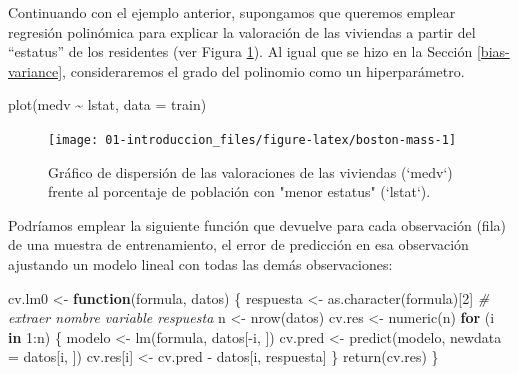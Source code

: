 \documentclass[
  spanish,
]{book}
\newenvironment{Shaded}{\begin{snugshade}}{\end{snugshade}}
\newcommand{\AttributeTok}[1]{\textcolor[rgb]{0.77,0.63,0.00}{#1}}
\newcommand{\CommentTok}[1]{\textcolor[rgb]{0.56,0.35,0.01}{\textit{#1}}}
\newcommand{\ControlFlowTok}[1]{\textcolor[rgb]{0.13,0.29,0.53}{\textbf{#1}}}
\newcommand{\DecValTok}[1]{\textcolor[rgb]{0.00,0.00,0.81}{#1}}
\newcommand{\FunctionTok}[1]{\textcolor[rgb]{0.00,0.00,0.00}{#1}}
\newcommand{\NormalTok}[1]{#1}
\newcommand{\OtherTok}[1]{\textcolor[rgb]{0.56,0.35,0.01}{#1}}
\newcommand{\SpecialCharTok}[1]{\textcolor[rgb]{0.00,0.00,0.00}{#1}}
\theoremstyle{break}
\theoremstyle{definition}
\theoremstyle{definition}
\theoremstyle{definition}
\theoremstyle{definition}
\theoremstyle{remark}
\begin{document}
Continuando con el ejemplo anterior, supongamos que queremos emplear regresión polinómica para explicar la valoración de las viviendas a partir del ``estatus'' de los residentes (ver Figura \ref{fig:boston-mass}).
Al igual que se hizo en la Sección \ref{bias-variance}, consideraremos el grado del polinomio como un hiperparámetro.

\begin{Shaded}
\begin{Highlighting}[]
\FunctionTok{plot}\NormalTok{(medv }\SpecialCharTok{\textasciitilde{}}\NormalTok{ lstat, }\AttributeTok{data =}\NormalTok{ train)}
\end{Highlighting}
\end{Shaded}

\begin{figure}[!htb]

{\centering \texttt{[image: 01-introduccion\_files/figure-latex/boston-mass-1]} 

}

\caption{Gráfico de dispersión de las valoraciones de las viviendas (`medv`) frente al porcentaje de población con "menor estatus" (`lstat`).}\label{fig:boston-mass}
\end{figure}

Podríamos emplear la siguiente función que devuelve para cada observación (fila) de una muestra de entrenamiento, el error de predicción en esa observación ajustando un modelo lineal con todas las demás observaciones:

\begin{Shaded}
\begin{Highlighting}[]
\NormalTok{cv.lm0 }\OtherTok{\textless{}{-}} \ControlFlowTok{function}\NormalTok{(formula, datos) \{}
\NormalTok{    respuesta }\OtherTok{\textless{}{-}} \FunctionTok{as.character}\NormalTok{(formula)[}\DecValTok{2}\NormalTok{] }\CommentTok{\# extraer nombre variable respuesta}
\NormalTok{    n }\OtherTok{\textless{}{-}} \FunctionTok{nrow}\NormalTok{(datos)}
\NormalTok{    cv.res }\OtherTok{\textless{}{-}} \FunctionTok{numeric}\NormalTok{(n)}
    \ControlFlowTok{for}\NormalTok{ (i }\ControlFlowTok{in} \DecValTok{1}\SpecialCharTok{:}\NormalTok{n) \{}
\NormalTok{        modelo }\OtherTok{\textless{}{-}} \FunctionTok{lm}\NormalTok{(formula, datos[}\SpecialCharTok{{-}}\NormalTok{i, ])}
\NormalTok{        cv.pred }\OtherTok{\textless{}{-}} \FunctionTok{predict}\NormalTok{(modelo, }\AttributeTok{newdata =}\NormalTok{ datos[i, ])}
\NormalTok{        cv.res[i] }\OtherTok{\textless{}{-}}\NormalTok{ cv.pred }\SpecialCharTok{{-}}\NormalTok{ datos[i, respuesta]}
\NormalTok{    \}}
    \FunctionTok{return}\NormalTok{(cv.res)}
\NormalTok{\}}
\end{Highlighting}
\end{Shaded}
\end{document}
